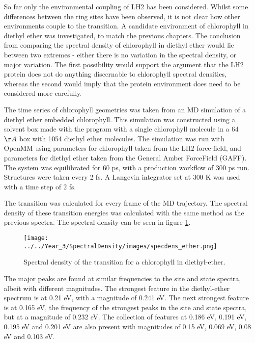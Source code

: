 So far only the environmental coupling of LH2 has been considered. Whilst some differences
between the ring sites have been observed, it is not clear how other environments 
couple to the \Qy transition. A candidate environment of chlorophyll in diethyl 
ether was investigated, to match the previous chapters. The conclusion from comparing
the spectral density of chlorophyll in diethyl ether would lie between two extremes
- either there is no variation in the spectral density, or major variation. The first
possibility would support the argument that the LH2 protein does not do anything 
discernable to chlorophyll spectral densities, whereas the second would imply that
the protein environment does need to be considered more carefully.

The time series of chlorophyll geometries was taken from an MD simulation of a diethyl 
ether embedded chlorophyll. This simulation was constructed using a solvent box 
made with the  program with a single chlorophyll  molecule in a 64 
$\AA{}$ box with 1054 diethyl ether molecules. The simulation was run with OpenMM 
using parameters for chlorophyll taken from the LH2 force-field, and parameters 
for diethyl ether taken from the General Amber ForceField (GAFF). The system was
equilibrated for 60 ps, with a production workflow of 300 ps run. Structures were 
taken every 2 fs. A Langevin integrator set at 300 K was used with a time step of 2 fs.

The \Qy transition was calculated for every frame of the MD trajectory. The spectral
density of these transition energies was calculated with the same method as the 
previous spectra. The spectral density can be seen in figure \ref{fig:specdens_ether}.

\begin{figure}
    \centering
    \texttt{[image: ../../Year\_3/SpectralDensity/images/specdens\_ether.png]}
    \caption{Spectral density of the \Qy transition for a chlorophyll in diethyl-ether.}
    \label{fig:specdens_ether}
\end{figure}

The major peaks are found at similar frequencies to the site and state spectra, albeit
with different magnitudes. The strongest feature in the diethyl-ether spectrum is
at 0.21 eV, with a magnitude of 0.241 eV. The next strongest feature is at 0.165 
eV, the frequency of the strongest peaks in the site and state spectra, but at a
magnitude of 0.232 eV. The collection of features at 0.186 eV, 0.191 eV, 0.195 eV
and 0.201 eV are also present with magnitudes of 0.15 eV, 0.069 eV, 0.08 eV and 
0.103 eV.

